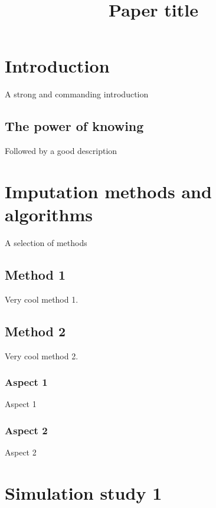\documentclass[a4paper,man,floatsintext,natbib]{apa6}\usepackage[]{graphicx}\usepackage[]{xcolor}
\title{Paper title}
\begin{document}
	\maketitle

    \linenumbers

    \setcounter{secnumdepth}{3} %

    
\section{Introduction}

    A strong and commanding introduction

\subsection{The power of knowing}

    Followed by a good description
    
\section{Imputation methods and algorithms}\label{sec:methods}

	A selection of methods

\subsection{Method 1}

	Very cool method 1.

\subsection{Method 2}

	Very cool method 2.

\subsubsection{Aspect 1}

	Aspect 1

\subsubsection{Aspect 2}

	Aspect 2
    
\section{Simulation study 1}
\end{document}

